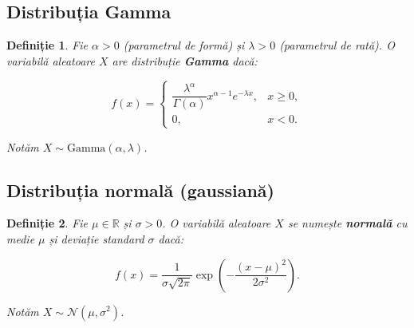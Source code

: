 \documentclass[12pt]{article}
\theoremstyle{plain}
\newtheorem{definition}{Definiție}
\begin{document}
\subsection{Distribuția Gamma}

\begin{definition}
Fie $\alpha > 0$ (parametrul de formă) și $\lambda > 0$ (parametrul de rată).
O variabilă aleatoare $X$ are distribuție \textbf{Gamma} dacă:


\[
f(x) =
\begin{cases}
\dfrac{\lambda^\alpha}{\Gamma(\alpha)} x^{\alpha - 1} e^{-\lambda x}, & x \ge 0,\\[6pt]
0, & x < 0.
\end{cases}
\]


Notăm $X \sim \mathrm{Gamma}(\alpha,\lambda)$.
\end{definition}

\subsection{Distribuția normală (gaussiană)}

\begin{definition}
Fie $\mu \in \mathbb{R}$ și $\sigma > 0$.
O variabilă aleatoare $X$ se numește \textbf{normală} cu medie $\mu$ și deviație standard $\sigma$ dacă:


\[
f(x) = \frac{1}{\sigma \sqrt{2\pi}}
\exp\!\left( -\frac{(x - \mu)^2}{2\sigma^2} \right).
\]


Notăm $X \sim \mathcal{N}(\mu,\sigma^2)$.
\end{definition}
\end{document}
